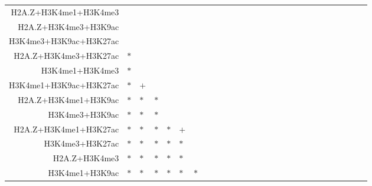 \begin{table}[h!]
\begin{center}
\begin{tabular}{ rABABABCABCACDCDCAEGCDECEFE }
    H2A.Z+H3K4me1+H3K4me3 &     &     &     &     &     &     &     &     &     &     &     &     &     &     &     &     &     &     &     &     &     &     &     &     &     &      \\
    H2A.Z+H3K4me3+H3K9ac &     &     &     &     &     &     &     &     &     &     &     &     &     &     &     &     &     &     &     &     &     &     &     &     &      &     \\
    H3K4me3+H3K9ac+H3K27ac &     &     &     &     &     &     &     &     &     &     &     &     &     &     &     &     &     &     &     &     &     &     &     &     &      &     \\
    H2A.Z+H3K4me3+H3K27ac & $*$ &     &     &     &     &     &     &     &     &     &     &     &     &     &     &     &     &     &     &     &     &     &     &     &      &     \\
    H3K4me1+H3K4me3 & $*$ &     &     &     &     &     &     &     &     &     &     &     &     &     &     &     &     &     &     &     &     &     &     &     &     &      \\
    H3K4me1+H3K9ac+H3K27ac & $*$ & $+$ &     &     &     &     &     &     &     &     &     &     &     &     &     &     &     &     &     &     &     &     &     &     &      &     \\
    H2A.Z+H3K4me1+H3K9ac & $*$ & $*$ & $*$ &     &     &     &     &     &     &     &     &     &     &     &     &     &     &     &     &     &     &     &     &     &     &      \\
    H3K4me3+H3K9ac & $*$ & $*$ & $*$ &     &     &     &     &     &     &     &     &     &     &     &     &     &     &     &     &     &     &     &     &     &      &     \\
    H2A.Z+H3K4me1+H3K27ac & $*$ & $*$ & $*$ & $*$ & $+$ &     &     &     &     &     &     &     &     &     &     &     &     &     &     &     &     &     &     &     &      &     \\
    H3K4me3+H3K27ac & $*$ & $*$ & $*$ & $*$ & $*$ &     &     &     &     &     &     &     &     &     &     &     &     &     &     &     &     &     &     &     &      &     \\
    H2A.Z+H3K4me3 & $*$ & $*$ & $*$ & $*$ & $*$ &     &     &     &     &     &     &     &     &     &     &     &     &     &     &     &     &     &     &     &      &     \\
    H3K4me1+H3K9ac & $*$ & $*$ & $*$ & $*$ & $*$ & $*$ &     &     &     &     &     &     &     &     &     &     &     &     &     &     &     &     &     &     &      &     \\

\end{tabular}
\end{center}
\end{table}
